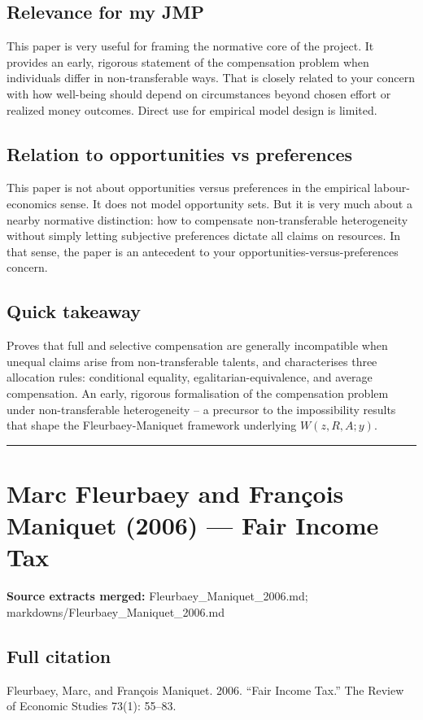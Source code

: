 \documentclass[11pt,a4paper]{article}
\begin{document}
\subsection*{Relevance for my JMP}
This paper is very useful for framing the normative core of the project. It provides an early, rigorous statement of the compensation problem when individuals differ in non-transferable ways. That is closely related to your concern with how well-being should depend on circumstances beyond chosen effort or realized money outcomes. Direct use for empirical model design is limited.

\subsection*{Relation to opportunities vs preferences}
This paper is not about opportunities versus preferences in the empirical labour-economics sense. It does not model opportunity sets. But it is very much about a nearby normative distinction: how to compensate non-transferable heterogeneity without simply letting subjective preferences dictate all claims on resources. In that sense, the paper is an antecedent to your opportunities-versus-preferences concern.

\subsection*{Quick takeaway}
Proves that full and selective compensation are generally incompatible when unequal claims arise from non-transferable talents, and characterises three allocation rules: conditional equality, egalitarian-equivalence, and average compensation. An early, rigorous formalisation of the compensation problem under non-transferable heterogeneity -- a precursor to the impossibility results that shape the Fleurbaey-Maniquet framework underlying $W(z,R,A;y)$.


\medskip\hrule\medskip

\section*{Marc Fleurbaey and François Maniquet (2006) — Fair Income Tax}

\textbf{Source extracts merged:} Fleurbaey\_Maniquet\_2006.md; markdowns/Fleurbaey\_Maniquet\_2006.md

\subsection*{Full citation}
Fleurbaey, Marc, and François Maniquet. 2006. “Fair Income Tax.” The Review of Economic Studies 73(1): 55–83.
\end{document}

